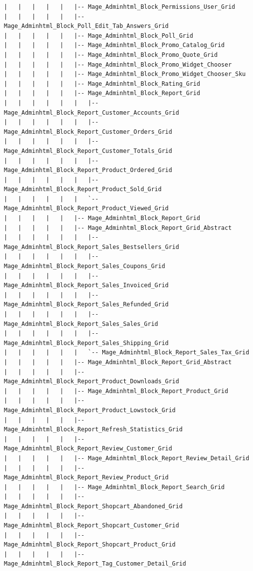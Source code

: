 \documentclass[oneside]{book}
\begin{document}
\begin{lstlisting}
|   |   |   |   |   |-- Mage_Adminhtml_Block_Permissions_User_Grid
|   |   |   |   |   |-- Mage_Adminhtml_Block_Poll_Edit_Tab_Answers_Grid
|   |   |   |   |   |-- Mage_Adminhtml_Block_Poll_Grid
|   |   |   |   |   |-- Mage_Adminhtml_Block_Promo_Catalog_Grid
|   |   |   |   |   |-- Mage_Adminhtml_Block_Promo_Quote_Grid
|   |   |   |   |   |-- Mage_Adminhtml_Block_Promo_Widget_Chooser
|   |   |   |   |   |-- Mage_Adminhtml_Block_Promo_Widget_Chooser_Sku
|   |   |   |   |   |-- Mage_Adminhtml_Block_Rating_Grid
|   |   |   |   |   |-- Mage_Adminhtml_Block_Report_Grid
|   |   |   |   |   |   |-- Mage_Adminhtml_Block_Report_Customer_Accounts_Grid
|   |   |   |   |   |   |-- Mage_Adminhtml_Block_Report_Customer_Orders_Grid
|   |   |   |   |   |   |-- Mage_Adminhtml_Block_Report_Customer_Totals_Grid
|   |   |   |   |   |   |-- Mage_Adminhtml_Block_Report_Product_Ordered_Grid
|   |   |   |   |   |   |-- Mage_Adminhtml_Block_Report_Product_Sold_Grid
|   |   |   |   |   |   `-- Mage_Adminhtml_Block_Report_Product_Viewed_Grid
|   |   |   |   |   |-- Mage_Adminhtml_Block_Report_Grid
|   |   |   |   |   |-- Mage_Adminhtml_Block_Report_Grid_Abstract
|   |   |   |   |   |   |-- Mage_Adminhtml_Block_Report_Sales_Bestsellers_Grid
|   |   |   |   |   |   |-- Mage_Adminhtml_Block_Report_Sales_Coupons_Grid
|   |   |   |   |   |   |-- Mage_Adminhtml_Block_Report_Sales_Invoiced_Grid
|   |   |   |   |   |   |-- Mage_Adminhtml_Block_Report_Sales_Refunded_Grid
|   |   |   |   |   |   |-- Mage_Adminhtml_Block_Report_Sales_Sales_Grid
|   |   |   |   |   |   |-- Mage_Adminhtml_Block_Report_Sales_Shipping_Grid
|   |   |   |   |   |   `-- Mage_Adminhtml_Block_Report_Sales_Tax_Grid
|   |   |   |   |   |-- Mage_Adminhtml_Block_Report_Grid_Abstract
|   |   |   |   |   |-- Mage_Adminhtml_Block_Report_Product_Downloads_Grid
|   |   |   |   |   |-- Mage_Adminhtml_Block_Report_Product_Grid
|   |   |   |   |   |-- Mage_Adminhtml_Block_Report_Product_Lowstock_Grid
|   |   |   |   |   |-- Mage_Adminhtml_Block_Report_Refresh_Statistics_Grid
|   |   |   |   |   |-- Mage_Adminhtml_Block_Report_Review_Customer_Grid
|   |   |   |   |   |-- Mage_Adminhtml_Block_Report_Review_Detail_Grid
|   |   |   |   |   |-- Mage_Adminhtml_Block_Report_Review_Product_Grid
|   |   |   |   |   |-- Mage_Adminhtml_Block_Report_Search_Grid
|   |   |   |   |   |-- Mage_Adminhtml_Block_Report_Shopcart_Abandoned_Grid
|   |   |   |   |   |-- Mage_Adminhtml_Block_Report_Shopcart_Customer_Grid
|   |   |   |   |   |-- Mage_Adminhtml_Block_Report_Shopcart_Product_Grid
|   |   |   |   |   |-- Mage_Adminhtml_Block_Report_Tag_Customer_Detail_Grid

\end{lstlisting}
\end{document}
